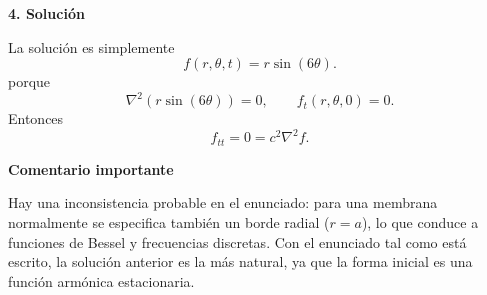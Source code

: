\documentclass[11pt,spanish]{article}
\begin{document}
{\bf 4. Solución}

La solución es simplemente
$$
\boxed{
f(r,\theta,t)
=
r\sin(6\theta).
}
$$
porque
$$
\nabla^2(r\sin(6\theta))=0,
\qquad
f_t(r,\theta,0)=0.
$$
Entonces
$$
f_{tt}=0=c^2\nabla^2f.
$$

{\bf Comentario importante}

Hay una inconsistencia probable en el enunciado: para una membrana normalmente se especifica también un borde radial ($r=a$), lo que conduce a funciones de Bessel y frecuencias discretas. 
Con el enunciado tal como está escrito, la solución anterior es la más natural, ya que la forma inicial es una función armónica estacionaria.

 
%
%
\end{document}

